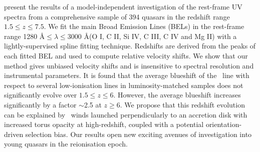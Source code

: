 \documentclass[a4paper,fleqn,usenatbib]{mnras}
\begin{document}
\citet{Meyer2019} present the results of a model-independent investigation of the rest-frame UV spectra from a comprehensive sample of 394 quasars in the redshift range $1.5\leq z \leq 7.5$. We fit the main Broad Emission Lines (BELs) in the rest-frame range 1280 \AA $\leq \lambda \leq $3000 \AA (O I, C II, Si IV, C III, C IV and Mg II) with a lightly-supervised spline fitting technique. Redshifts are derived from the peaks of each fitted BEL and used to compute relative velocity shifts. We show that our method gives unbiased velocity shifts and is insensitive to spectral resolution and instrumental parameters. It is found that the average blueshift of the \civ\, line with respect to several low-ionisation lines in luminosity-matched samples does not significantly evolve over $1.5\leq z\leq 6$. However, the average blueshift increases significantly by a factor $\sim$2.5 at $z \geq 6$. We propose that this redshift evolution can be explained by \civ\, winds launched perpendicularly to an accretion disk with increased torus opacity at high-redshift, coupled with a potential orientation-driven selection bias. Our results open new exciting avenues of investigation into young quasars in the reionisation epoch.
\end{document}
